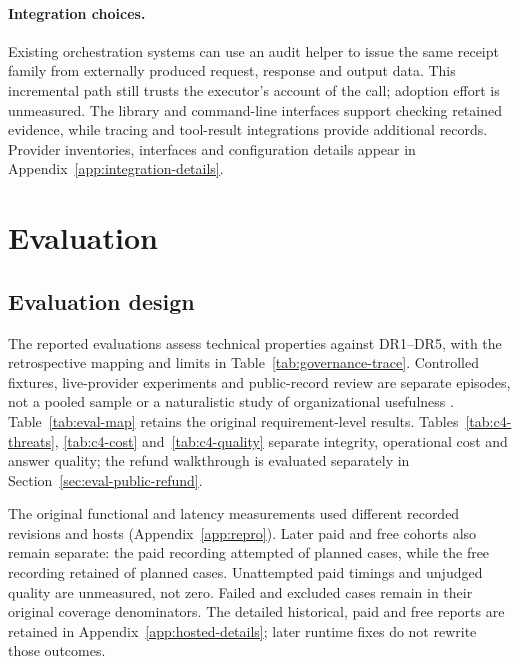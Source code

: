 \documentclass[11pt]{article}
\begin{document}
\paragraph{Integration choices.} Existing orchestration systems can use an audit helper to issue the same receipt family from externally produced request, response and output data. This incremental path still trusts the executor's account of the call; adoption effort is unmeasured. The library and command-line interfaces support checking retained evidence, while tracing and tool-result integrations provide additional records. Provider inventories, interfaces and configuration details appear in Appendix~\ref{app:integration-details}.

\FloatBarrier
\section{Evaluation}\label{sec:evaluation}

\subsection{Evaluation design}

The reported evaluations assess technical properties against DR1--DR5, with the retrospective mapping and limits in Table~\ref{tab:governance-trace}. Controlled fixtures, live-provider experiments and public-record review are separate episodes, not a pooled sample or a naturalistic study of organizational usefulness \citep{venable2016}. Table~\ref{tab:eval-map} retains the original requirement-level results. Tables~\ref{tab:c4-threats}, \ref{tab:c4-cost} and~\ref{tab:c4-quality} separate integrity, operational cost and answer quality; the refund walkthrough is evaluated separately in Section~\ref{sec:eval-public-refund}.

The original functional and latency measurements used different recorded revisions and hosts (Appendix~\ref{app:repro}). Later paid and free cohorts also remain separate: the paid recording attempted \CfourPaidAttempted{} of \CfourPaidExpected{} planned cases, while the free recording retained \CfourFreeRecorded{} of \CfourFreeExpected{} planned cases. Unattempted paid timings and unjudged quality are unmeasured, not zero. Failed and excluded cases remain in their original coverage denominators. The detailed historical, paid and free reports are retained in Appendix~\ref{app:hosted-details}; later runtime fixes do not rewrite those outcomes.
\end{document}
